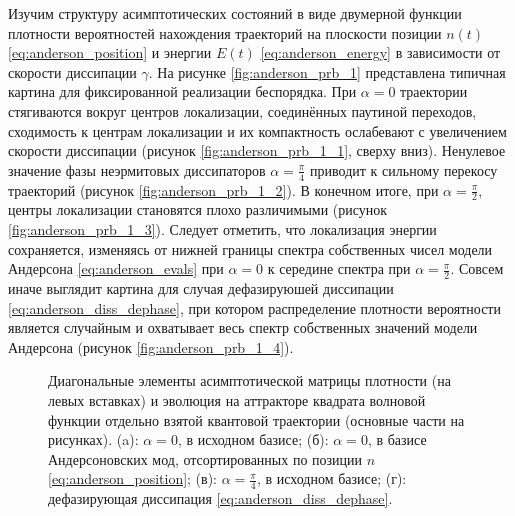 Изучим структуру асимптотических состояний в виде двумерной функции плотности вероятностей нахождения траекторий на плоскости позиции \(n(t)\) \cref{eq:anderson_position} и энергии \(E(t)\) \cref{eq:anderson_energy} в зависимости от скорости диссипации \(\gamma\). На рисунке \cref{fig:anderson_prb_1} представлена типичная картина для фиксированной реализации беспорядка. При \(\alpha=0\) траектории стягиваются вокруг центров локализации, соединённых паутиной переходов, сходимость к центрам локализации и их компактность ослабевают с увеличением скорости диссипации (рисунок \cref{fig:anderson_prb_1_1}, сверху вниз).
Ненулевое значение фазы неэрмитовых диссипаторов \(\alpha=\frac{\pi}{4}\) приводит к сильному перекосу траекторий (рисунок \cref{fig:anderson_prb_1_2}). В конечном итоге, при \(\alpha=\frac{\pi}{2}\), центры локализации становятся плохо различимыми (рисунок \cref{fig:anderson_prb_1_3}). Следует отметить, что локализация энергии сохраняется, изменяясь от нижней границы спектра собственных чисел модели Андерсона \cref{eq:anderson_evals} при \(\alpha=0\) к середине спектра при \(\alpha=\frac{\pi}{2}\). Совсем иначе выглядит картина для случая дефазируюшей диссипации \cref{eq:anderson_diss_dephase}, при котором распределение плотности вероятности является случайным и охватывает весь спектр собственных значений модели Андерсона (рисунок \cref{fig:anderson_prb_1_4}).

\begin{figure}[ht]
	\legend{}
	\caption[Этот текст попадает в названия рисунков в списке рисунков]
	{
		Диагональные элементы асимптотической матрицы плотности (на левых вставках) и эволюция на аттракторе квадрата волновой функции отдельно взятой квантовой траектории (основные части на рисунках). (a): \(\alpha = 0\), в исходном базисе; (б): \(\alpha = 0\), в базисе Андерсоновских мод, отсортированных по позиции \(n\) \cref{eq:anderson_position}; (в): \(\alpha=\frac{\pi}{4}\), в исходном базисе; (г): дефазирующая диссипация \cref{eq:anderson_diss_dephase}. 
	}
	\label{fig:anderson_prb_2}
\end{figure}

